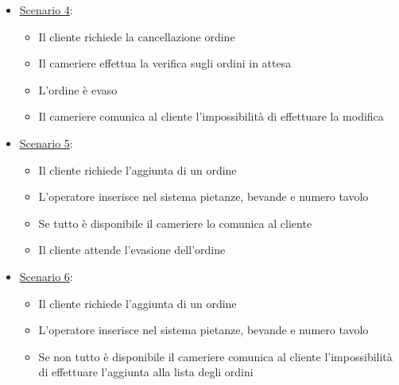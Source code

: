 \begin{enumerate}
\begin{itemize}
\begin{itemize}
            \item \uline{Scenario 4}:
            \begin{itemize}
                \item Il cliente richiede la cancellazione ordine
                \item Il cameriere effettua la verifica sugli ordini in attesa
                \item L'ordine \`e evaso
                \item Il cameriere comunica al cliente l'impossibilit\`a di effettuare la modifica
            \end{itemize}
            \item \uline{Scenario 5}:
            \begin{itemize}
                \item Il cliente richiede l'aggiunta di un ordine
                \item L'operatore inserisce nel sistema pietanze, bevande e 
                    numero tavolo
                \item Se tutto \`e disponibile il cameriere lo comunica al cliente 
                \item Il cliente attende l'evasione dell'ordine
            \end{itemize}
            \item \uline{Scenario 6}:
            \begin{itemize}
                \item Il cliente richiede l'aggiunta di un ordine
                \item L'operatore inserisce nel sistema pietanze, bevande e 
                    numero tavolo
                \item Se non tutto \`e disponibile il cameriere comunica al cliente l'impossibilit\`a 
                    di effettuare l'aggiunta alla lista degli ordini 
            \end{itemize}
        \end{itemize}
    \end{itemize}


\end{enumerate}
